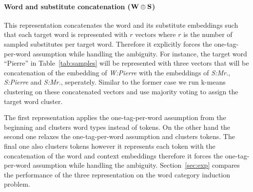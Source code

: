\paragraph{Word and substitute concatenation (${\bf W\oplus S}$)} 
This representation concatenates the word and its substitute
embeddings such that each target word is represented with $r$ vectors
where $r$ is the number of sampled substitutes per target word.
Therefore it explicitly forces the one-tag-per-word assumption while
handling the ambiguity.  For instance, the target word ``Pierre'' in
Table~\ref{tab:samples} will be represented with three vectors that
will be concatenation of the embedding of {\it W:Pierre} with the
embeddings of {\it S:Mr.}, {\it S:Pierre} and {\it S:Mr.}, seperately.
Similar to the former case we run k-means clustering on these
concatenated vectors and use majority voting to assign the target word
cluster.

The first representation applies the one-tag-per-word assumption from
the beginning and clusters word types instead of tokens.  On the other
hand the second one relaxes the one-tag-per-word assumption and
clusters tokens.  The final one also clusters tokens however it
represents each token with the concatenation of the word and context
embeddings therefore it forces the one-tag-per-word assumption while
handling the ambiguity.  Section~\ref{sec:exp} compares the
performance of the three representation on the word category induction
problem.

